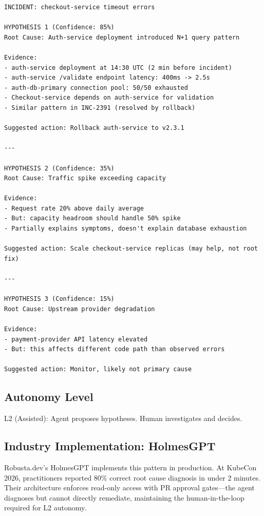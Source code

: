 \begin{lstlisting}[caption={Root Cause Hypothesis Example}]
INCIDENT: checkout-service timeout errors

HYPOTHESIS 1 (Confidence: 85%)
Root Cause: Auth-service deployment introduced N+1 query pattern

Evidence:
- auth-service deployment at 14:30 UTC (2 min before incident)
- auth-service /validate endpoint latency: 400ms -> 2.5s
- auth-db-primary connection pool: 50/50 exhausted
- Checkout-service depends on auth-service for validation
- Similar pattern in INC-2391 (resolved by rollback)

Suggested action: Rollback auth-service to v2.3.1

---

HYPOTHESIS 2 (Confidence: 35%)
Root Cause: Traffic spike exceeding capacity

Evidence:
- Request rate 20% above daily average
- But: capacity headroom should handle 50% spike
- Partially explains symptoms, doesn't explain database exhaustion

Suggested action: Scale checkout-service replicas (may help, not root fix)

---

HYPOTHESIS 3 (Confidence: 15%)
Root Cause: Upstream provider degradation

Evidence:
- payment-provider API latency elevated
- But: this affects different code path than observed errors

Suggested action: Monitor, likely not primary cause
\end{lstlisting}

\subsection{Autonomy Level}

L2 (Assisted): Agent proposes hypotheses. Human investigates and decides.

\subsection{Industry Implementation: HolmesGPT}

Robusta.dev's HolmesGPT implements this pattern in production. At KubeCon 2026, practitioners reported 80\% correct root cause diagnosis in under 2 minutes. Their architecture enforces read-only access with PR approval gates---the agent diagnoses but cannot directly remediate, maintaining the human-in-the-loop required for L2 autonomy.

